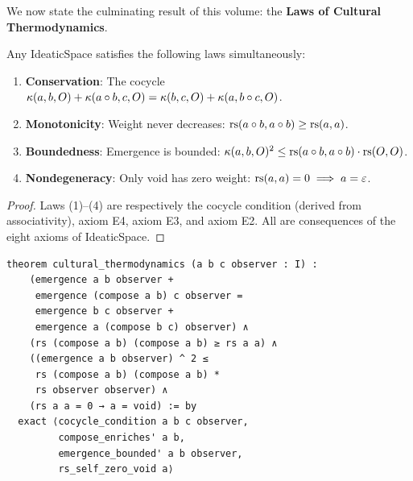 We now state the culminating result of this volume: the
\textbf{Laws of Cultural Thermodynamics}.

\begin{theorem}
\label{thm:cultural-thermo}
Any IdeaticSpace satisfies the following laws simultaneously:
\begin{enumerate}
\item \textbf{Conservation}: The cocycle
  $\kappa(a,b,O) + \kappa(a \circ b, c, O) =
   \kappa(b,c,O) + \kappa(a, b \circ c, O)$.
\item \textbf{Monotonicity}: Weight never decreases:
  $\mathrm{rs}(a \circ b, a \circ b) \geq \mathrm{rs}(a, a)$.
\item \textbf{Boundedness}: Emergence is bounded:
  $\kappa(a,b,O)^2 \leq \mathrm{rs}(a \circ b, a \circ b) \cdot \mathrm{rs}(O, O)$.
\item \textbf{Nondegeneracy}: Only void has zero weight:
  $\mathrm{rs}(a, a) = 0 \implies a = \varepsilon$.
\end{enumerate}
\end{theorem}

\begin{proof}
Laws (1)--(4) are respectively the cocycle condition (derived from
associativity), axiom E4, axiom E3, and axiom E2.  All are
consequences of the eight axioms of IdeaticSpace.
\end{proof}

\begin{lstlisting}
theorem cultural_thermodynamics (a b c observer : I) :
    (emergence a b observer +
     emergence (compose a b) c observer =
     emergence b c observer +
     emergence a (compose b c) observer) ∧
    (rs (compose a b) (compose a b) ≥ rs a a) ∧
    ((emergence a b observer) ^ 2 ≤
     rs (compose a b) (compose a b) *
     rs observer observer) ∧
    (rs a a = 0 → a = void) := by
  exact ⟨cocycle_condition a b c observer,
         compose_enriches' a b,
         emergence_bounded' a b observer,
         rs_self_zero_void a⟩
\end{lstlisting}

